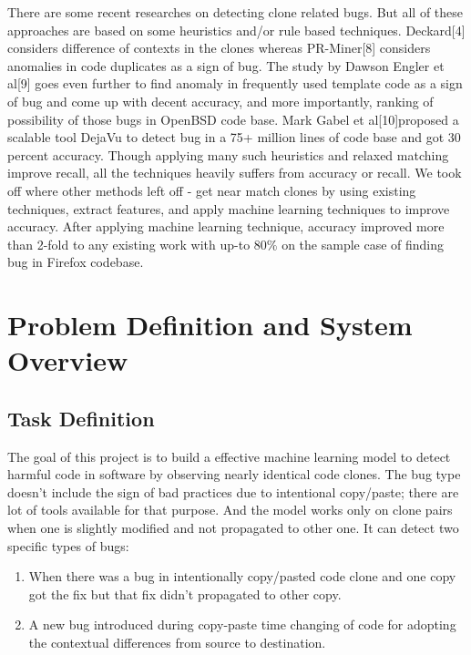 \documentclass[11pt]{article}
\begin{document}
\vspace{10 pt}
There are some recent researches on detecting clone related bugs. But all of these approaches are based on some heuristics and/or rule based techniques. Deckard[4] considers difference of contexts in the clones whereas PR-Miner[8] considers anomalies in code duplicates as a sign of bug. The study by Dawson Engler et al[9] goes even further to find anomaly in frequently used template code as a sign of bug and come up with decent accuracy, and more importantly, ranking of possibility of those bugs in OpenBSD code base. Mark Gabel et al[10]proposed a scalable tool DejaVu to detect bug in a 75+ million lines of code base and got 30 percent accuracy. Though applying many such heuristics and relaxed matching improve recall, all the techniques heavily suffers from accuracy or recall. We took off where other methods left off - get near match clones by using existing techniques, extract features, and apply machine learning techniques to improve accuracy. After applying machine learning technique, accuracy improved more than 2-fold to any existing work with up-to $80\%$ on the sample case of finding bug in Firefox codebase.

\section{Problem Definition and System Overview}
\subsection{Task Definition}
The goal of this project is to build a effective machine learning model to detect harmful code in software by observing nearly identical code clones. The bug type doesn’t include the sign of bad practices due to intentional copy/paste; there are lot of tools available for that purpose. And the model works only on clone pairs when one is slightly modified and not propagated to other one. It can detect two specific types of bugs:

\begin{enumerate}
\item When there was a bug in intentionally copy/pasted code clone and one copy got the fix but that fix didn’t propagated to other copy.
\item A new bug introduced during copy-paste time changing of code for adopting the contextual differences from source to destination.
\end{enumerate}
\end{document}
